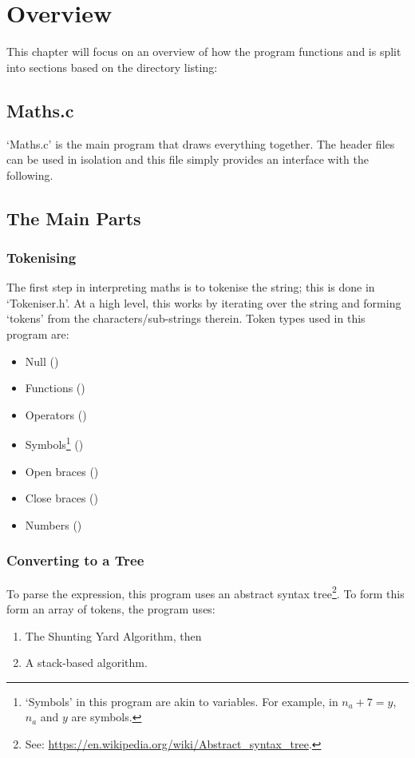 \chapter{Overview}
    This chapter will focus on an overview of how the program functions and is split into sections based on the directory listing:

    \section{Maths.c}
        `Maths.c' is the main program that draws everything together. The header files can be used in isolation and this file simply provides an interface with the following.

    \section{The Main Parts}
        \subsection{Tokenising}
            The first step in interpreting maths is to tokenise the string; this is done in `Tokeniser.h'. At a high level, this works by iterating over the string and forming `tokens' from the characters/sub-strings therein. Token types used in this program are:
            \begin{itemize}
                \item Null ()
                \item Functions ()
                \item Operators ()
                \item Symbols\footnote{`Symbols' in this program are akin to variables. For example, in $n_a + 7 = y$, $n_a$ and $y$ are symbols.} ()
                \item Open braces ()
                \item Close braces ()
                \item Numbers ()
            \end{itemize}

        \subsection{Converting to a Tree}
            To parse the expression, this program uses an abstract syntax tree\footnote{See: \url{https://en.wikipedia.org/wiki/Abstract_syntax_tree}.}. To form this form an array of tokens, the program uses:
            \begin{enumerate}
                \item The Shunting Yard Algorithm, then
                \item A stack-based algorithm.
            \end{enumerate}


